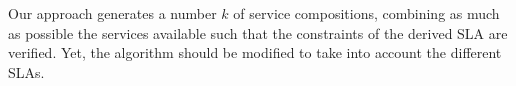 



 
  
  Our approach  generates a number $k$ of service compositions, combining as much as possible the services available such that the constraints of the derived SLA are verified. 
 Yet, the algorithm should be modified to take into account the different SLAs. 


